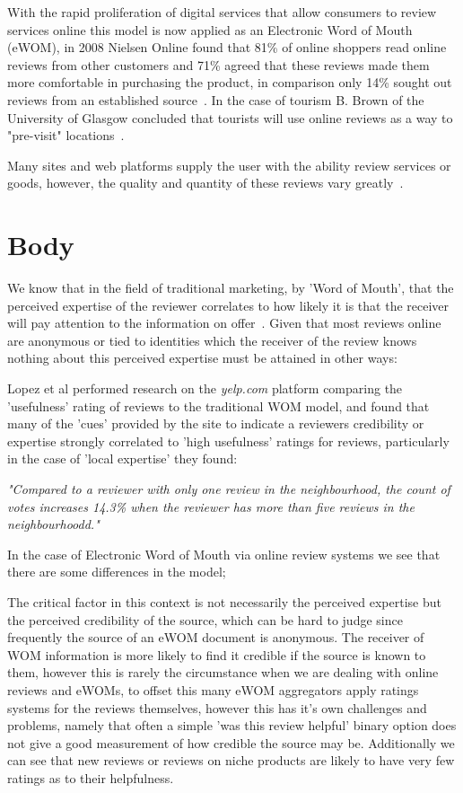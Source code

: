 With the rapid proliferation of digital services that allow consumers to review services online this model is now applied as an Electronic Word of Mouth (eWOM), in 2008 Nielsen Online found that 81\% of online shoppers read online reviews from other customers and 71\% agreed that these reviews made them more comfortable in purchasing the product, in comparison only 14\% sought out reviews from an established source~\cite{Nielsen}. In the case of tourism B. Brown of the University of Glasgow concluded that tourists will use online reviews as a way to "pre-visit" locations~\cite{Brown}.

Many sites and web platforms supply the user with the ability review services or goods, however, the quality and quantity of these reviews vary greatly~\cite{Zhang}.

\section{Body}
We know that in the field of traditional marketing, by 'Word of Mouth', that the perceived expertise of the reviewer correlates to how likely it is that the receiver will pay attention to the information on offer~\cite{Bansal}. Given that most reviews online are anonymous or tied to identities which the receiver of the review knows nothing about this perceived expertise must be attained in other ways:

Lopez et al\cite{Lopez} performed research on the \emph{yelp.com} platform comparing the 'usefulness' rating of reviews to the traditional WOM model, and found that many of the 'cues' provided by the site to indicate a reviewers credibility or expertise strongly correlated to 'high usefulness' ratings for reviews, particularly in the case of 'local expertise' they found: 

\emph{"Compared to a reviewer with only one review in the neighbourhood, the count of votes increases 14.3\% when the reviewer has more than five reviews in the neighbourhoodd."}

In the case of Electronic Word of Mouth via online review systems we see that there are some differences in the model;

The critical factor in this context is not necessarily the perceived expertise but the perceived credibility of the source, which can be hard to judge since frequently the source of an eWOM document is anonymous. The receiver of WOM information is more likely to find it credible if the source is known to them\cite{Bart}, however this is rarely the circumstance when we are dealing with online reviews and eWOMs, to offset this many eWOM aggregators apply ratings systems for the reviews themselves\cite{Krestel}, however this has it's own challenges and problems, namely that often a simple 'was this review helpful' binary option does not give a good measurement of how credible the source may be. Additionally we can see that new reviews or reviews on niche products are likely to have very few ratings as to their helpfulness\cite{Ghose}. 

